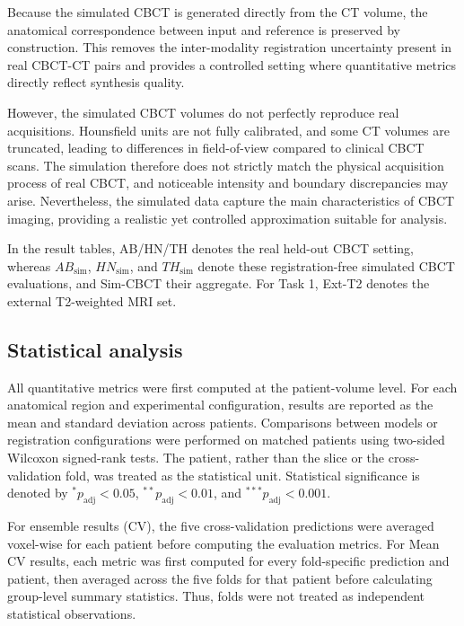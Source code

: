\documentclass[lettersize,journal]{IEEEtran}
\begin{document}
Because the simulated CBCT is generated directly from the CT volume, the anatomical correspondence between input and reference is preserved by construction. This removes the inter-modality registration uncertainty present in real CBCT-CT pairs and provides a controlled setting where quantitative metrics directly reflect synthesis quality.

However, the simulated CBCT volumes do not perfectly reproduce real acquisitions. Hounsfield units are not fully calibrated, and some CT volumes are truncated, leading to differences in field-of-view compared to clinical CBCT scans. The simulation therefore does not strictly match the physical acquisition process of real CBCT, and noticeable intensity and boundary discrepancies may arise. Nevertheless, the simulated data capture the main characteristics of CBCT imaging, providing a realistic yet controlled approximation suitable for analysis.

In the result tables, AB/HN/TH denotes the real held-out CBCT setting, whereas $AB_{\mathrm{sim}}$, $HN_{\mathrm{sim}}$, and $TH_{\mathrm{sim}}$ denote these registration-free simulated CBCT evaluations, and Sim-CBCT their aggregate. For Task 1, Ext-T2 denotes the external T2-weighted MRI set.

\subsection{Statistical analysis}
\label{sec:statistics}

All quantitative metrics were first computed at the patient-volume level. For each anatomical region and experimental configuration, results are reported as the mean and standard deviation across patients. Comparisons between models or registration configurations were performed on matched patients using two-sided Wilcoxon signed-rank tests. The patient, rather than the slice or the cross-validation fold, was treated as the statistical unit. Statistical significance is denoted by $^{*}p_{\mathrm{adj}}<0.05$, $^{**}p_{\mathrm{adj}}<0.01$, and $^{***}p_{\mathrm{adj}}<0.001$.

For ensemble results (CV), the five cross-validation predictions were averaged voxel-wise for each patient before computing the evaluation metrics. For Mean CV results, each metric was first computed for every fold-specific prediction and patient, then averaged across the five folds for that patient before calculating group-level summary statistics. Thus, folds were not treated as independent statistical observations.
\end{document}
